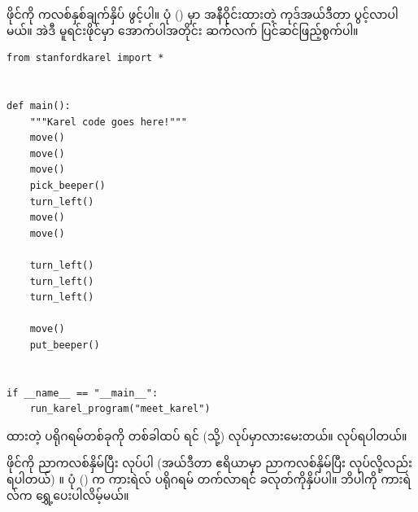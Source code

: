  ဖိုင်ကို ကလစ်နှစ်ချက်နှိပ် ဖွင့်ပါ။ ပုံ (\fRefNo{\ref{fig:edit_meet_karel}}) မှာ အနီဝိုင်းထားတဲ့  ကုဒ်အယ်ဒီတာ  ပွင့်လာပါမယ်။ အဲဒီ မူရင်းဖိုင်မှာ အောက်ပါအတိုင်း ဆက်လက် ပြင်ဆင်ဖြည့်စွက်ပါ။
%
\setlength{\fboxsep}{0pt}
\label{lst:mtkrl}
\begin{verbatim}
from stanfordkarel import *


def main():
    """Karel code goes here!"""
    move()
    move()
    move()
    pick_beeper()
    turn_left()
    move()
    move()

    turn_left()
    turn_left()
    turn_left()

    move()
    put_beeper()


if __name__ == "__main__":
    run_karel_program("meet_karel")
\end{verbatim}
%




\begin{mytcbox}
 ထားတဲ့ ပရိုဂရမ်တစ်ခုကို တစ်ခါထပ်  ရင်  (သို့)  လုပ်မှာလားမေးတယ်။  လုပ်ရပါတယ်။
\end{mytcbox}

 ဖိုင်ကို ညာကလစ်နှိမ်ပြီး  လုပ်ပါ (အယ်ဒီတာ ဧရိယာမှာ ညာကလစ်နှိမ်ပြီး  လုပ်လို့လည်း ရပါတယ်) ။ ပုံ (\fRefNo{\ref{fig:mtkrlpgm}}) က ကားရဲလ် ပရိုဂရမ် တက်လာရင်  ခလုတ်ကိုနှိပ်ပါ။ ဘိပါကို ကားရဲလ်က ရွှေ့ပေးပါလိမ့်မယ်။

